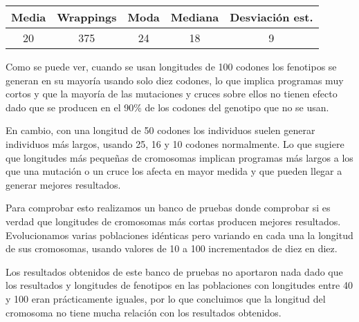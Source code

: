 \begin{table}[H]
\centering
\begin{tabular}{ccccc}
\hline
\textbf{Media} & \textbf{Wrappings} & \textbf{Moda} & \textbf{Mediana} & \textbf{Desviación  est.} \\ \hline
20           & 375                & 24            & 18               & 9                      \\ \hline
\end{tabular}
\end{table}

Como se puede ver, cuando se usan longitudes de 100 codones los fenotipos se generan en su mayoría usando solo diez codones, lo que implica programas muy cortos y que la mayoría de las mutaciones y cruces sobre ellos no tienen efecto dado que se producen en el 90\% de los codones del genotipo que no se usan.

En cambio, con una longitud de 50 codones los individuos suelen generar individuos más largos, usando 25, 16 y 10 codones normalmente. Lo que sugiere que longitudes más pequeñas de cromosomas implican programas más largos a los que una mutación o un cruce los afecta en mayor medida y que pueden llegar a generar mejores resultados.

Para comprobar esto realizamos un banco de pruebas donde comprobar si es verdad que longitudes de cromosomas más cortas producen mejores resultados. Evolucionamos varias poblaciones idénticas pero variando en cada una la longitud de sus cromosomas, usando valores de 10 a 100 incrementados de diez en diez.

Los resultados obtenidos de este banco de pruebas no aportaron nada dado que los resultados y longitudes de fenotipos en las poblaciones con longitudes entre 40 y 100 eran prácticamente iguales, por lo que concluimos que la longitud del cromosoma no tiene mucha relación con los resultados obtenidos.

